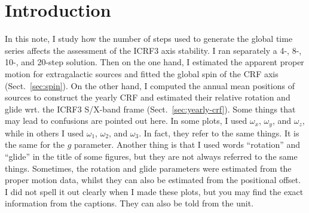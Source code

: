 \documentclass{aa-note}    %
\begin{document}



\section{Introduction}     \label{sec:introduction}

In this note, I study how the number of steps used to generate the global time series affects the assessment of the ICRF3 axis stability.
I ran separately a 4-, 8-, 10-, and 20-step solution. 
Then on the one hand, I estimated the apparent proper motion for extragalactic sources and fitted the global spin of the CRF axis (Sect.~\ref{sec:spin}).
On the other hand, I computed the annual mean positions of sources to construct the yearly CRF and estimated their relative rotation and glide wrt. the ICRF3 S/X-band frame (Sect.~\ref{sec:yearly-crf}).
Some things that may lead to confusions are pointed out here.
In some plots, I used $\omega_x$, $\omega_y$, and $\omega_z$, while in others I used $\omega_1$, $\omega_2$, and $\omega_3$.
In fact, they refer to the same things.
It is the same for the $g$ parameter.
Another thing is that I used words ``rotation'' and ``glide'' in the title of some figures, but they are not always referred to the same things.
Sometimes, the rotation and glide parameters were estimated from the proper motion data, whilst they can also be estimated from the positional offset.
I did not spell it out clearly when I made these plots, but you may find the exact information from the captions. 
They can also be told from the unit.
\end{document}
